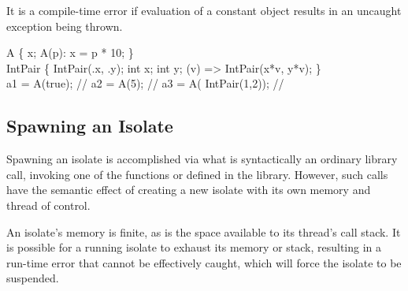 \documentclass[makeidx]{article}
\begin{document}
\LMHash{}%
It is a compile-time error if evaluation of a constant object
results in an uncaught exception being thrown.


\begin{dartCode}
\CLASS{} A \{
   \FINAL{} x;
   \CONST{} A(p): x = p * 10;
\}
\\
\CLASS{} IntPair \{
  \CONST{} IntPair(\THIS{}.x, \THIS{}.y);
  \FINAL{} int x;
  \FINAL{} int y;
  \OPERATOR *(v) => \NEW{} IntPair(x*v, y*v);
\}
\\
\CONST a1 = \CONST{} A(true); // 
\CONST a2 = \CONST{} A(5); // 
\CONST a3 = \CONST{} A(\CONST{} IntPair(1,2)); // 
\end{dartCode}



\subsection{Spawning an Isolate}

\LMHash{}%
Spawning an isolate is accomplished via what is syntactically an ordinary library call, invoking one of the functions  or  defined in the  library.
However, such calls have the semantic effect of creating a new isolate with its own memory and thread of control.

\LMHash{}%
An isolate's memory is finite, as is the space available to its thread's call stack.
It is possible for a running isolate to exhaust its memory or stack, resulting in a run-time error that cannot be effectively caught, which will force the isolate to be suspended.

\end{document}
